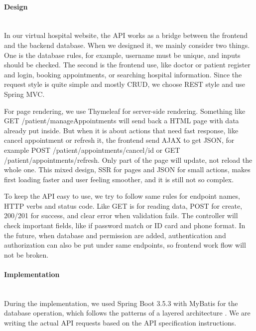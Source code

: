 %
%

\paragraph{Design}\mbox{}\\

In our virtual hospital website, the API works as a bridge between the frontend and the backend database. When we designed it, we mainly consider two things. One is the database rules, for example, username must be unique, and inputs should be checked. The second is the frontend use, like doctor or patient register and login, booking appointments, or searching hospital information. Since the request style is quite simple and mostly CRUD, we choose REST style and use Spring MVC.

For page rendering, we use Thymeleaf for server-side rendering. Something like GET /patient/manageAppointments will send back a HTML page with data already put inside. But when it is about actions that need fast response, like cancel appointment or refresh it, the frontend send AJAX to get JSON, for example POST /patient/appointments/cancel/{id} or GET /patient/appointments/refresh. Only part of the page will update, not reload the whole one. This mixed design, SSR for pages and JSON for small actions, makes first loading faster and user feeling smoother, and it is still not so complex.

To keep the API easy to use, we try to follow same rules for endpoint names, HTTP verbs and status code. Like GET is for reading data, POST for create, 200/201 for success, and clear error when validation fails. The controller will check important fields, like if password match or ID card and phone format. In the future, when database and permission are added, authentication and authorization can also be put under same endpoints, so frontend work flow will not be broken.

\clearpage

\paragraph{Implementation}\mbox{}\\

During the implementation, we used Spring Boot 3.5.3 with MyBatis for the database operation, which follows the patterns of a layered architecture \cite{fowler2002}. We are writing the actual API requests based on the API specification instructions.

